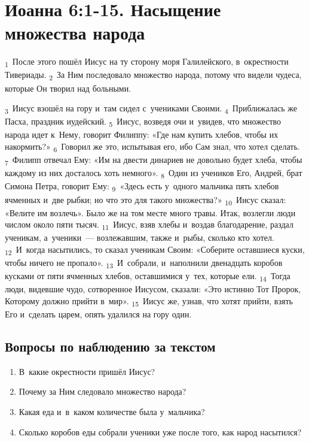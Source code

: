 \documentclass[a4paper,12pt]{article}
\begin{document}
\section{Иоанна 6:1-15. Насыщение множества народа}

\textsubscript{1}~После этого пошёл Иисус на ту сторону моря Галилейского, в~окрестности Тивериады.
\textsubscript{2}~За Ним последовало множество народа, потому что видели чудеса, которые Он творил над больными. 

\textsubscript{3}~Иисус взошёл на гору и~там сидел с~учениками Своими.
\textsubscript{4}~Приближалась же Пасха, праздник иудейский.
\textsubscript{5}~Иисус, возведя очи и~увидев, что множество народа идет к~Нему, говорит Филиппу: «Где нам купить хлебов, чтобы их накормить?»
\textsubscript{6}~Говорил же это, испытывая его, ибо Сам знал, что хотел сделать.
\textsubscript{7}~Филипп отвечал Ему: «Им на двести динариев не довольно будет хлеба, чтобы каждому из них досталось хоть немного».
\textsubscript{8}~Один из учеников Его, Андрей, брат Симона Петра, говорит Ему:
\textsubscript{9}~«Здесь есть у~одного мальчика пять хлебов ячменных и~две рыбки; но что это для такого множества?»
\textsubscript{10}~Иисус сказал: «Велите им возлечь». Было же на том месте много травы. Итак, возлегли люди числом около пяти тысяч.
\textsubscript{11}~Иисус, взяв хлебы и~воздав благодарение, раздал ученикам, а~ученики~--- возлежавшим, также и~рыбы, сколько кто хотел.
\textsubscript{12}~И~когда насытились, то сказал ученикам Своим: «Соберите оставшиеся куски, чтобы ничего не пропало».
\textsubscript{13}~И~собрали, и~наполнили двенадцать коробов кусками от пяти ячменных хлебов, оставшимися у~тех, которые ели.
\textsubscript{14}~Тогда люди, видевшие чудо, сотворенное Иисусом, сказали: «Это истинно Тот Пророк, Которому должно прийти в~мир».
\textsubscript{15}~Иисус же, узнав, что хотят прийти, взять Его и~сделать царем, опять удалился на гору один. 

\subsection*{Вопросы по наблюдению за текстом}
\begin{enumerate}
    \item В~какие окрестности пришёл Иисус? 
    
    \myline
    
    \item Почему за Ним следовало множество народа? 
    
    \myline
    
    \item Какая еда и~в~каком количестве была у~мальчика? 
    
    \myline
    
    \item Сколько коробов еды собрали ученики уже после того, как народ насытился? 
    
    \myline
\end{enumerate}
\end{document}
